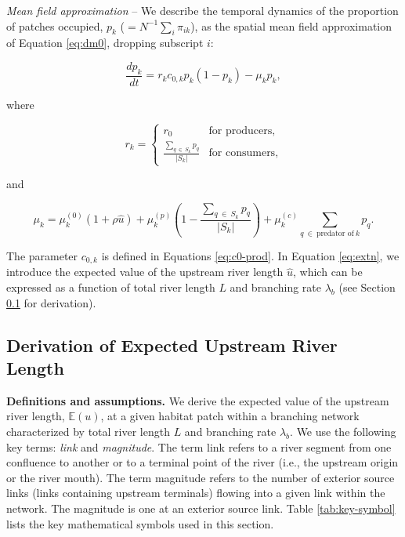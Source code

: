 \documentclass[11pt, class=article, crop=false]{standalone}
\begin{document}
\textit{Mean field approximation} --
We describe the temporal dynamics of the proportion of patches occupied, $p_k$ ($= N^{-1} \sum_i \pi_{ik}$), as the spatial mean field approximation of Equation \ref{eq:dm0}, dropping subscript $i$:

\begin{equation}
    \frac{dp_k}{dt} = r_{k} c_{0, k} p_{k} (1 - p_{k}) - \mu_{k} p_{k},
    \label{eq:master}
\end{equation}

where

\begin{equation}
    r_{k} = 
    \begin{cases}
        r_0 & \text{for producers,}\\
        \frac{\sum_{q~\in~S_k} p_{q}}{|S_{k}|} & \text{for consumers,}
    \end{cases}
\end{equation}

and

\begin{equation}
    \mu_{k} = 
        \mu_{k}^{(0)} (1 + \rho \hat{u}) + 
        \mu_{k}^{(p)} \left(1 - \frac{\sum_{q~\in~S_k} p_{q}}{|S_{k}|} \right) + 
        \mu_{k}^{(c)} \sum_{q~\in~\text{predator of}~ k} p_{q}.
    \label{eq:extn}    
\end{equation}

The parameter $c_{0, k}$ is defined in Equations \ref{eq:c0-prod}. 
In Equation \ref{eq:extn}, we introduce the expected value of the upstream river length $\hat{u}$, which can be expressed as a function of total river length $L$ and branching rate $\lambda_b$ (see Section \ref{updist} for derivation).

\newpage

\subsection{Derivation of Expected Upstream River Length} \label{updist}

\textbf{Definitions and assumptions.}
We derive the expected value of the upstream river length, $\mathbb{E}(u)$, at a given habitat patch within a branching network characterized by total river length $L$ and branching rate $\lambda_b$.
We use the following key terms: \textit{link} and \textit{magnitude}.
The term link refers to a river segment from one confluence to another or to a terminal point of the river (i.e., the upstream origin or the river mouth).
The term magnitude refers to the number of exterior source links (links containing upstream terminals) flowing into a given link within the network.
The magnitude is one at an exterior source link.
Table \ref{tab:key-symbol} lists the key mathematical symbols used in this section.
\end{document}

